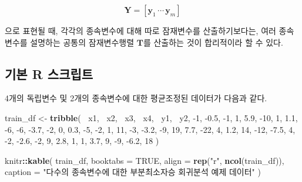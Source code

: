 \documentclass[]{book}
\newenvironment{Shaded}{\begin{snugshade}}{\end{snugshade}}
\newcommand{\DataTypeTok}[1]{\textcolor[rgb]{0.13,0.29,0.53}{#1}}
\newcommand{\DecValTok}[1]{\textcolor[rgb]{0.00,0.00,0.81}{#1}}
\newcommand{\FloatTok}[1]{\textcolor[rgb]{0.00,0.00,0.81}{#1}}
\newcommand{\KeywordTok}[1]{\textcolor[rgb]{0.13,0.29,0.53}{\textbf{#1}}}
\newcommand{\NormalTok}[1]{#1}
\newcommand{\OperatorTok}[1]{\textcolor[rgb]{0.81,0.36,0.00}{\textbf{#1}}}
\newcommand{\OtherTok}[1]{\textcolor[rgb]{0.56,0.35,0.01}{#1}}
\newcommand{\StringTok}[1]{\textcolor[rgb]{0.31,0.60,0.02}{#1}}
\begin{document}
\[\mathbf{Y} = \left[ \mathbf{y}_1 \, \cdots \, \mathbf{y}_m \right]\]

으로 표현될 때, 각각의 종속변수에 대해 따로 잠재변수를 산출하기보다는, 여러 종속변수를 설명하는 공통의 잠재변수행렬 \(\mathbf{T}\)를 산출하는 것이 합리적이라 할 수 있다.

\hypertarget{plsr-multivariate-basic-script}{%
\subsection{기본 R 스크립트}\label{plsr-multivariate-basic-script}}

4개의 독립변수 및 2개의 종속변수에 대한 평균조정된 데이터가 다음과 같다.

\begin{Shaded}
\begin{Highlighting}[]
\NormalTok{train_df <-}\StringTok{ }\KeywordTok{tribble}\NormalTok{(}
  \OperatorTok{~}\NormalTok{x1, }\OperatorTok{~}\NormalTok{x2, }\OperatorTok{~}\NormalTok{x3, }\OperatorTok{~}\NormalTok{x4, }\OperatorTok{~}\NormalTok{y1, }\OperatorTok{~}\NormalTok{y2,}
  \DecValTok{-1}\NormalTok{, }\FloatTok{-0.5}\NormalTok{, }\DecValTok{-1}\NormalTok{, }\DecValTok{1}\NormalTok{, }\FloatTok{5.9}\NormalTok{, }\DecValTok{-10}\NormalTok{,}
  \DecValTok{1}\NormalTok{, }\FloatTok{1.1}\NormalTok{, }\DecValTok{-6}\NormalTok{, }\DecValTok{-6}\NormalTok{, }\FloatTok{-3.7}\NormalTok{, }\DecValTok{-2}\NormalTok{,}
  \DecValTok{0}\NormalTok{, }\FloatTok{0.3}\NormalTok{, }\DecValTok{-5}\NormalTok{, }\DecValTok{-2}\NormalTok{, }\DecValTok{1}\NormalTok{, }\DecValTok{11}\NormalTok{,}
  \DecValTok{-3}\NormalTok{, }\FloatTok{-3.2}\NormalTok{, }\DecValTok{-9}\NormalTok{, }\DecValTok{19}\NormalTok{, }\FloatTok{7.7}\NormalTok{, }\DecValTok{-22}\NormalTok{,}
  \DecValTok{4}\NormalTok{, }\FloatTok{1.2}\NormalTok{, }\DecValTok{14}\NormalTok{, }\DecValTok{-12}\NormalTok{, }\FloatTok{-7.5}\NormalTok{, }\DecValTok{4}\NormalTok{,}
  \DecValTok{-2}\NormalTok{, }\FloatTok{-2.6}\NormalTok{, }\DecValTok{-2}\NormalTok{, }\DecValTok{9}\NormalTok{, }\FloatTok{2.8}\NormalTok{, }\DecValTok{1}\NormalTok{,}
  \DecValTok{1}\NormalTok{, }\FloatTok{3.7}\NormalTok{, }\DecValTok{9}\NormalTok{, }\DecValTok{-9}\NormalTok{, }\FloatTok{-6.2}\NormalTok{, }\DecValTok{18}
\NormalTok{)}

\NormalTok{knitr}\OperatorTok{::}\KeywordTok{kable}\NormalTok{(}
\NormalTok{  train_df, }\DataTypeTok{booktabs =} \OtherTok{TRUE}\NormalTok{,}
  \DataTypeTok{align =} \KeywordTok{rep}\NormalTok{(}\StringTok{"r"}\NormalTok{, }\KeywordTok{ncol}\NormalTok{(train_df)),}
  \DataTypeTok{caption =} \StringTok{"다수의 종속변수에 대한 부분최소자승 회귀분석 예제 데이터"}
\NormalTok{)}
\end{Highlighting}
\end{Shaded}
\end{document}
